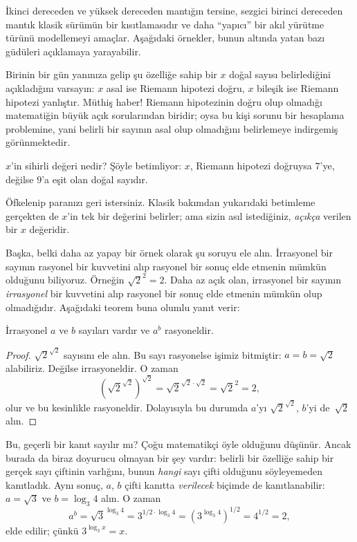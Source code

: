 \documentclass[../../../include/open-logic-section]{subfiles}
\begin{document}


İkinci dereceden ve yüksek dereceden mantığın tersine, sezgici birinci
dereceden mantık klasik sürümün bir kısıtlamasıdır ve daha ``yapıcı'' bir akıl
yürütme türünü modellemeyi amaçlar. Aşağıdaki örnekler, bunun altında yatan
bazı güdüleri açıklamaya yarayabilir.

Birinin bir gün yanınıza gelip şu özelliğe sahip bir $x$ doğal sayısı
belirlediğini açıkladığını varsayın: $x$ asal ise Riemann hipotezi doğru, $x$
bileşik ise Riemann hipotezi yanlıştır. Müthiş haber!{} Riemann hipotezinin
doğru olup olmadığı matematiğin büyük açık sorularından biridir; oysa bu kişi
sorunu bir hesaplama problemine, yani belirli bir sayının asal olup olmadığını
belirlemeye indirgemiş görünmektedir.

$x$'in sihirli değeri nedir? Şöyle betimliyor: $x$, Riemann hipotezi doğruysa
$7$'ye, değilse $9$'a eşit olan doğal sayıdır.

Öfkelenip paranızı geri istersiniz. Klasik bakımdan yukarıdaki betimleme
gerçekten de $x$'in tek bir değerini belirler; ama sizin asıl istediğiniz,
\emph{açıkça} verilen bir $x$ değeridir.

Başka, belki daha az yapay bir örnek olarak şu soruyu ele alın. İrrasyonel bir
sayının rasyonel bir kuvvetini alıp rasyonel bir sonuç elde etmenin mümkün
olduğunu biliyoruz. Örneğin $\sqrt{2}^2 = 2$. Daha az açık olan, irrasyonel bir
sayının \emph{irrasyonel} bir kuvvetini alıp rasyonel bir sonuç elde etmenin
mümkün olup olmadığıdır. Aşağıdaki teorem buna olumlu yanıt verir:

\begin{thm}
İrrasyonel $a$ ve $b$ sayıları vardır ve $a^b$ rasyoneldir.
\end{thm}

\begin{proof}
$\sqrt{2}^{\sqrt{2}}$ sayısını ele alın. Bu sayı rasyonelse işimiz bitmiştir:
$a = b = \sqrt{2}$ alabiliriz. Değilse irrasyoneldir. O zaman
\[
(\sqrt{2}^{\sqrt{2}})^{\sqrt{2}} = \sqrt{2}^{\sqrt{2} \cdot
  \sqrt{2}} = \sqrt{2}^2 = 2,
\]
olur ve bu kesinlikle rasyoneldir. Dolayısıyla bu durumda $a$'yı
$\sqrt{2}^{\sqrt{2}}$, $b$'yi de~$\sqrt 2$ alın.
\end{proof}

Bu, geçerli bir kanıt sayılır mı? Çoğu matematikçi öyle olduğunu düşünür.
Ancak burada da biraz doyurucu olmayan bir şey vardır: belirli bir özelliğe
sahip bir gerçek sayı çiftinin varlığını, bunun \emph{hangi} sayı çifti
olduğunu söyleyemeden kanıtladık. Aynı sonuç, $a$, $b$ çifti kanıtta
\emph{verilecek} biçimde de kanıtlanabilir: $a = \sqrt{3}$ ve $b = \log_3 4$
alın. O zaman
\[
a^b = \sqrt{3}^{\log_3 4} = 3^{1/2 \cdot \log_3 4} = (3^{\log_3
  4})^{1/2} = 4^{1/2}= 2,
\]
elde edilir; çünkü $3^{\log_3 x} = x$.
\end{document}
